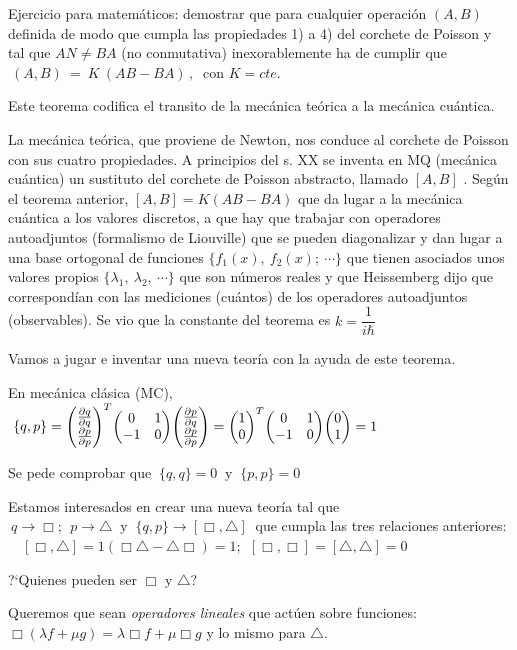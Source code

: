 \vspace{5mm}
\begin{ejemplo}
\color{gris}
\begin{small}
Ejercicio para matemáticos: demostrar que para cualquier operación $(A,B)$ definida de modo que cumpla las propiedades 1) a 4) del corchete de Poisson y tal que $AN\neq BA$ (no conmutativa) inexorablemente ha de cumplir que $\ (A,B) \ = \ K\ (AB-BA) \,  , \ $ con $K=cte$.

Este teorema codifica el transito de la mecánica teórica a la mecánica cuántica.

La mecánica teórica, que proviene de Newton, nos conduce al corchete de Poisson con sus cuatro propiedades. A principios del s. XX se inventa en MQ (mecánica cuántica) un sustituto del corchete de Poisson abstracto, llamado $[A,B]$	. Según el teorema anterior, $[A,B]=K(AB-BA)$ que da lugar a la mecánica cuántica a los valores discretos, a que hay que trabajar con operadores autoadjuntos (formalismo de Liouville) que se pueden diagonalizar y dan lugar a una base ortogonal de funciones $\{f_1(x),\ f_2(x);\ \cdots \}$ que tienen asociados unos valores propios $\{ \lambda_1,\ \lambda_2,\ \cdots \}$ que son números reales y que Heissemberg dijo que correspondían con las mediciones (cuántos) de los operadores autoadjuntos (observables). Se vio que la constante del teorema es $k=\dfrac 1{i\hbar}$

\vspace{5mm} Vamos a jugar e inventar una nueva teoría con la ayuda de este teorema.

En mecánica clásica (MC), $\ \{q,p\}=\mqty(\pdv{q}{q}\\ \pdv{p}{p})^T \mqty(0&1\\-1&0) \mqty(\pdv{p}{q} \\ \pdv{p}{p})=\mqty(1\\0)^T \mqty(0&1 \\ -1&0)\mqty(0\\1)=1$

Se pede comprobar que $\ \{q,q\}=0 \ \text{ y } \ \{p,p\}=0$

Estamos interesados en crear una nueva teoría tal que $\ q\to \Box;\ \ p\to \triangle \ \text{ y } \ \{q,p\} \to [\Box, \triangle ]\ $ que cumpla las tres relaciones anteriores: $\quad [\Box, \triangle ]=1(\Box \triangle - \triangle \Box )=1;\ \ [\Box, \Box]=[\triangle, \triangle ]=0$

?`Quienes pueden ser $\Box \text{ y } \triangle$? 

Queremos que sean \emph{operadores lineales} que actúen sobre funciones: $\Box(\lambda f + \mu g)=\lambda \Box f + \mu \Box g$ y lo mismo para $\triangle$.


\end{small}
\end{ejemplo}
